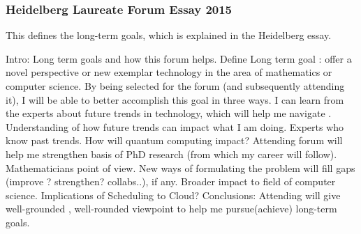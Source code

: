 \begin{frame}
\frametitle{Heidelberg Laureate Forum Essay 2015}
{\tiny This defines the long-term goals, which is explained in the Heidelberg essay}.\\ 
\begin{outline}[enumerate]
\tiny \1 {\tiny Intro: Long term goals and how this forum helps. } 
\tiny \2 {\tiny Define Long term goal : offer a novel perspective or 
new exemplar technology in the area of mathematics or computer
science.} 
\tiny \2 {\tiny By being selected for the forum (and subsequently
  attending it), I will be able to better accomplish this goal in
  three ways.} 
\tiny \1 {\tiny I can learn from the experts about future trends in technology, which will help me navigate .} 
\tiny \2 {\tiny Understanding of how future trends can impact what I am doing.}
\tiny \2 {\tiny Experts who know past trends. How will quantum
  computing impact?} 
\tiny \1 {\tiny Attending forum will help me strengthen basis of PhD 
  research (from which my career will follow). Mathematicians point of view. } 
\tiny \2 {\tiny New ways of formulating the problem will fill gaps (improve ? strengthen? collabs..), if any. %
}
\tiny \1  {\tiny Broader impact to field of computer science. } 
\tiny \2 {\tiny  Implications of Scheduling to Cloud?} 
\tiny \1 {\tiny Conclusions: Attending will give well-grounded ,
  well-rounded viewpoint to help me pursue(achieve) long-term goals.} 
\end{outline}  
\end{frame}



